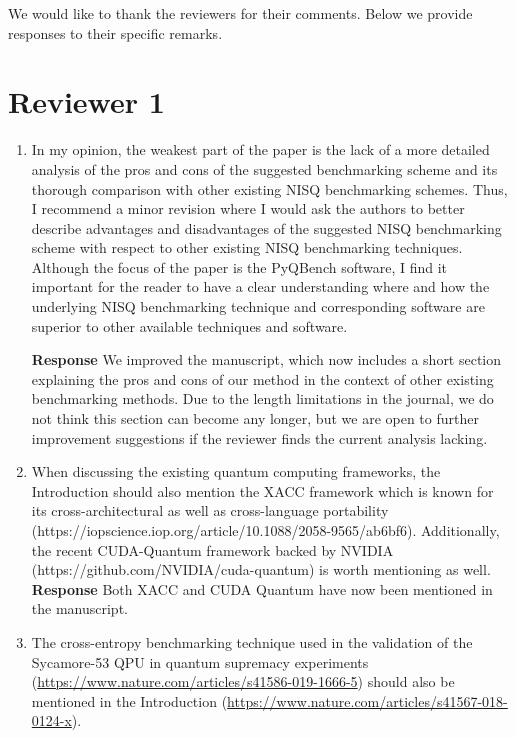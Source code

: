 \documentclass[a4paper,12pt]{article}
\newcommand{\1}{{\rm 1\hspace{-0.9mm}l}}
\newenvironment{response}{\vspace{1em}\noindent\textbf{Response}}{\vspace{1em}}
\begin{document}
We would like to thank the reviewers for their comments. Below we provide
responses to their specific remarks.

\section{Reviewer 1}

\begin{enumerate}
  \item  In my opinion, the weakest part of the paper is the lack of a more
    detailed analysis of the pros and cons of the suggested benchmarking scheme
    and its thorough comparison with other existing NISQ benchmarking schemes.
    Thus, I recommend a minor revision where I would ask the authors to better
    describe advantages and disadvantages of the suggested NISQ benchmarking
    scheme with respect to other existing NISQ benchmarking techniques.
    Although the focus of the paper is the PyQBench software, I find it
    important for the reader to have a clear understanding where and how the
    underlying NISQ benchmarking technique and corresponding software are
    superior to other available techniques and software.

    \begin{response}
      We improved the manuscript, which now includes a short section explaining
      the pros and cons of our method in the context of other existing
      benchmarking methods. Due to the length limitations in the journal, we do
      not think this section can become any longer, but we are open to further
      improvement suggestions if the reviewer finds the current analysis
      lacking.
    \end{response}
  \item When discussing the existing quantum computing frameworks, the
    Introduction should also mention the XACC framework which is known for its
    cross-architectural as well as cross-language portability \\
    (https://iopscience.iop.org/article/10.1088/2058-9565/ab6bf6).
    Additionally, the recent CUDA-Quantum framework backed by NVIDIA
    (https://github.com/NVIDIA/cuda-quantum) is worth mentioning as well.
    \begin{response}
      Both XACC and CUDA Quantum have now been mentioned in the manuscript.
    \end{response}
  \item The cross-entropy benchmarking technique used in the validation of the
    Sycamore-53 QPU in quantum supremacy experiments
    (\url{https://www.nature.com/articles/s41586-019-1666-5}) should also be
    mentioned in the Introduction
    (\url{https://www.nature.com/articles/s41567-018-0124-x}).


\end{enumerate}
\end{document}
